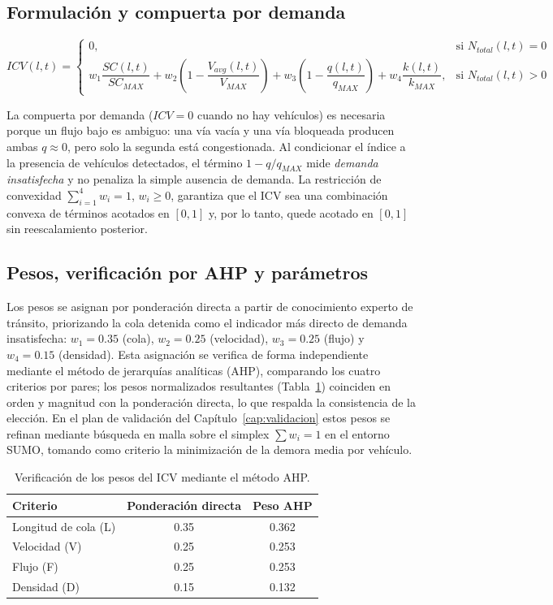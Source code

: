 \subsection{Formulación y compuerta por demanda}\label{subsec:icv-formula}

\[
ICV(l,t) =
\begin{cases}
0, & \text{si } N_{total}(l,t)=0\\[6pt]
w_{1}\dfrac{SC(l,t)}{SC_{MAX}}
+ w_{2}\!\left(1-\dfrac{V_{avg}(l,t)}{V_{MAX}}\right)
+ w_{3}\!\left(1-\dfrac{q(l,t)}{q_{MAX}}\right)
+ w_{4}\dfrac{k(l,t)}{k_{MAX}}, & \text{si } N_{total}(l,t)>0
\end{cases}
\]

La compuerta por demanda ($ICV=0$ cuando no hay vehículos) es necesaria porque un flujo bajo
es ambiguo: una vía vacía y una vía bloqueada producen ambas $q\approx 0$, pero solo la segunda
está congestionada. Al condicionar el índice a la presencia de vehículos detectados, el término
$1-q/q_{MAX}$ mide \emph{demanda insatisfecha} y no penaliza la simple ausencia de demanda. La
restricción de convexidad $\sum_{i=1}^{4}w_{i}=1$, $w_{i}\geq 0$, garantiza que el ICV sea una
combinación convexa de términos acotados en $[0,1]$ y, por lo tanto, quede acotado en $[0,1]$
sin reescalamiento posterior.

\subsection{Pesos, verificación por AHP y parámetros}\label{subsec:icv-pesos}

Los pesos se asignan por ponderación directa a partir de conocimiento experto de tránsito,
priorizando la cola detenida como el indicador más directo de demanda insatisfecha:
$w_{1}=0.35$ (cola), $w_{2}=0.25$ (velocidad), $w_{3}=0.25$ (flujo) y $w_{4}=0.15$ (densidad).
Esta asignación se verifica de forma independiente mediante el método de jerarquías analíticas
(AHP), comparando los cuatro criterios por pares; los pesos normalizados resultantes
(Tabla~\ref{tab:ahp}) coinciden en orden y magnitud con la ponderación directa, lo que respalda
la consistencia de la elección. En el plan de validación del Capítulo~\ref{cap:validacion}
estos pesos se refinan mediante búsqueda en malla sobre el simplex $\sum w_{i}=1$ en el entorno
SUMO, tomando como criterio la minimización de la demora media por vehículo.

\begin{table}[H]
  \centering
  \caption{Verificación de los pesos del ICV mediante el método AHP.}
  \label{tab:ahp}
  \begin{tabular}{@{}lcc@{}}
    \toprule
    \textbf{Criterio} & \textbf{Ponderación directa} & \textbf{Peso AHP} \\
    \midrule
    Longitud de cola (L) & 0.35 & 0.362 \\
    Velocidad (V)        & 0.25 & 0.253 \\
    Flujo (F)            & 0.25 & 0.253 \\
    Densidad (D)         & 0.15 & 0.132 \\
    \bottomrule
  \end{tabular}
\end{table}


